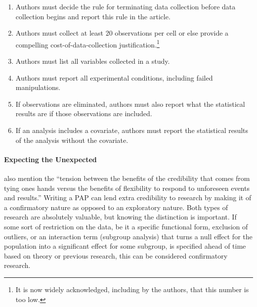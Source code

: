 \documentclass[12pt] {article}
\begin{document}
\begin{enumerate}
\def\labelenumi{\arabic{enumi}.}
\item
  Authors must decide the rule for terminating data collection before
  data collection begins and report this rule in the article.
\item
  Authors must collect at least 20 observations per cell or else provide
  a compelling cost-of-data-collection justification.\footnote{It is now widely acknowledged, including by the authors, that this number is too low.}
\item
  Authors must list all variables collected in a study.
\item
  Authors must report all experimental conditions, including failed
  manipulations.
\item
  If observations are eliminated, authors must also report what the
  statistical results are if those observations are included.
\item
  If an analysis includes a covariate, authors must report the
  statistical results of the analysis without the covariate.
\end{enumerate}

\paragraph{Expecting the Unexpected}
\cite{glennerster_running_2013} also mention the ``tension between
the benefits of the credibility that comes from tying ones hands versus
the benefits of flexibility to respond to unforeseen events and
results.'' Writing a PAP can lend extra credibility to research by making it of a confirmatory nature as opposed to an exploratory nature.
Both types of research are absolutely valuable, but knowing the distinction is important. If some sort of restriction on the data, be it a specific functional form, exclusion of outliers, or an interaction term (subgroup analysis) that turns a null effect for the population into a significant effect for some subgroup, is specified ahead of time based on theory or previous research, this can be considered confirmatory research. 
\end{document}
